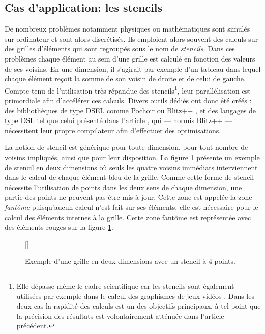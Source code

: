\subsection{Cas d'application: les stencils}
\label{sec:stencil_base}

De nombreux problèmes notamment physiques ou mathématiques sont simulés sur ordinateur et sont alors discrétisés. Ils emploient alors souvent des calculs sur des grilles d'éléments qui sont regroupés sous le nom de \emph{stencils}. Dans ces problèmes chaque élément au sein d'une grille est calculé en fonction des valeurs de ses voisins. En une dimension, il s'agirait par exemple d'un tableau dans lequel chaque élément reçoit la somme de son voisin de droite et de celui de gauche. Compte-tenu de l'utilisation très répandue des stencils\footnote{Elle dépasse même le cadre scientifique car les stencils sont également utilisées par exemple dans le calcul des graphismes de jeux vidéos \cite{Art15}. Dans les deux cas la rapidité des calculs est un des objectifs principaux, à tel point que la précision des résultats est volontairement atténuée dans l'article précédent.}, leur parallélisation est primordiale afin d'accélérer ces calculs. Divers outils dédiés ont donc été créés : des bibliothèques de type DSEL comme \textsf{Pochoir} \cite{Art18} ou \textsf{Blitz++} \cite{Art5}, et des langages de type DSL tel que celui présenté dans l'article \cite{Art19}, qui --- hormis \textsf{Blitz++} --- nécessitent leur propre compilateur afin d'effectuer des optimisations.  

La notion de stencil est générique pour toute dimension, pour tout nombre de voisins impliqués, ainsi que pour leur disposition. La figure \ref{fig:stencil_base} présente un exemple de stencil en deux dimensions où seuls les quatre voisins immédiats interviennent dans le calcul de chaque élément bleu de la grille. Comme cette forme de stencil nécessite l'utilisation de points dans les deux sens de chaque dimension, une partie des points ne peuvent pas être mis à jour. Cette zone est appelée la zone \emph{fantôme} puisqu'aucun calcul n'est fait sur ses éléments, elle est nécessaire pour le calcul des éléments internes à la grille. Cette zone fantôme est représentée avec des éléments rouges sur la figure \ref{fig:stencil_base}.

\begin{figure}[!h]
[\FBwidth]
{\caption{Exemple d'une grille en deux dimensions avec un stencil à 4 points.}\label{fig:stencil_base}}
{}
\end{figure}

